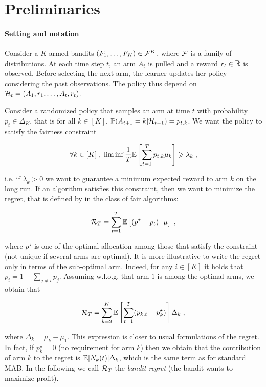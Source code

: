 \section{Preliminaries}

\paragraph{Setting and notation} Consider a $K$-armed bandits $(F_1,\dots, F_K) \in \mathcal{F}^K$, where $\mathcal{F}$ is a family of distributions. At each time step $t$, an arm $A_t$ is pulled and a reward $r_t\in\mathbb{R}$ is observed. Before selecting the next arm, the learner updates her policy considering the past observations. The policy thus depend on $\mathcal{H}_{t}=(A_1,r_1,\dots, A_t, r_t)$.

Consider a randomized policy that samples an arm at time $t$ with probability $p_t \in \Delta_K$, that is for all $k \in [K]$, $\mathbb{P}(A_{t+1}=k | \mathcal{H}_{t-1})=p_{t, k}$. We want the policy to satisfy the fairness constraint

\[\forall k \in [K]\;, \; \liminf \frac{1}{T} \mathbb{E}\left[\sum_{t=1}^T p_{t,k} \mu_k \right] \geqslant \lambda_k \;,\]

i.e. if $\lambda_k>0$ we want to guarantee a minimum expected reward to arm $k$ on the long run. If an algorithm satisfies this constraint, then we want to minimize the regret, that is defined by in the class of fair algorithms:

\[ \mathcal{R}_T = \sum_{t=1}^T \mathbb{E}\left[(p^\star - p_t)^\top\mu \right]\;, \]

where $p^\star$ is one of the optimal allocation among those that satisfy the constraint (not unique if several arms are optimal). It is more illustrative to write the regret only in terms of the sub-optimal arm. Indeed, for any $i\in [K]$ it holds that $p_i = 1-\sum_{j \neq i } p_j$. Assuming w.l.o.g. that arm $1$ is among the optimal arms, we obtain that 

\begin{equation}\label{eq::regret}\mathcal{R}_T =  \sum_{k=2}^K \mathbb{E}\left[\sum_{t=1}^T (p_{k,t} - p^\star_k)\right] \Delta_k \;, \end{equation}

where $\Delta_k = \mu_k - \mu_1$. This expression is closer to usual formulations of the regret. In fact, if $p_k^\star=0$ (no requirement for arm $k$) then we obtain that the contribution of arm $k$ to the regret is $\mathbb{E}[N_k(t)] \Delta_k$, which is the same term as for standard MAB. In the following we call $\mathcal{R}_T$ the \emph{bandit regret} (the bandit wants to maximize profit). 

